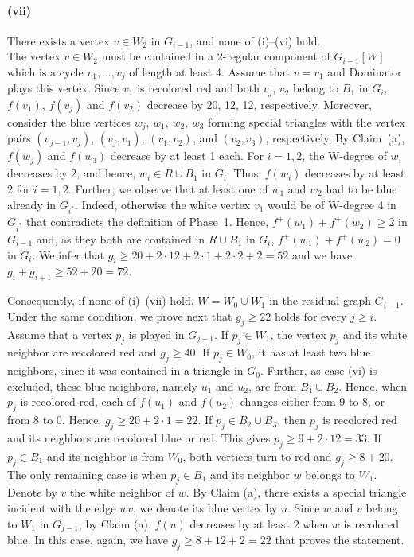 \documentclass[12pt]{article}
\begin{document}
\paragraph{(vii)} There exists a vertex $v \in W_2$ in $G_{i-1}$,  and none of (i)--(vi) hold.\\
The vertex $v\in W_2$ must be contained in a 2-regular component of $G_{i-1}[W]$ which is a cycle $v_1,\dots,v_j$ of length at least 4. Assume that $v=v_1$ and Dominator plays this vertex. Since $v_1$ is recolored red and both $v_j$, $v_2$ belong to $B_1$ in $G_i$, $f(v_1)$, $f(v_j)$
and $f(v_2)$ decrease by 20, 12, 12, respectively. Moreover, consider the blue vertices $w_j$, $w_1$, $w_2$, $w_3$ forming special triangles with the vertex pairs $(v_{j-1},v_j)$, $(v_{j},v_1)$, $(v_{1},v_2)$, and $(v_{2},v_3)$, respectively. By Claim~(a), $f(w_j)$ and $f(w_3)$  decrease by at least 1 each. For $i=1,2$, the W-degree of $w_i$ decreases by 2; and hence, $w_i \in R\cup B_1$ in $G_i$. Thus, $f(w_i)$ decreases by at least 2 for $i=1, 2$. Further, we observe that at least one of $w_1$ and $w_2$ had to be blue already in $G_{i^*}$. Indeed, otherwise the white vertex $v_1$ would be of W-degree 4 in $G_{i^*}$ that contradicts the definition of Phase~1. Hence, $f^+(w_1)+f^+(w_2)\ge 2$ in $G_{i-1}$ and, as they both are contained in $R\cup B_1$ in $G_i$, $f^+(w_1)+f^+(w_2)=0$ in $G_i$. We infer that $g_i \ge 20+2\cdot 12 +2\cdot 1 +2\cdot 2+2=52$ and we have $g_i+g_{i+1}\ge 52+20=72$.

\medskip

Consequently, if none of (i)--(vii) hold, $W=W_0 \cup W_1$ in the residual graph $G_{i-1}$.
Under the same condition, we prove next that $g_j \ge 22$ holds for every $j \ge i$.
Assume that a vertex $p_j$ is played in $G_{j-1}$. If $p_j\in W_1$, the vertex $p_j$ and its white neighbor are recolored red and $g_j \ge 40$. If $p_j \in W_0$, it has at least two blue neighbors, since it was contained in a triangle in $G_0$. Further, as case (vi) is excluded, these blue neighbors, namely $u_1$ and $u_2$, are from $B_1\cup B_2$. Hence, when $p_j$ is recolored red, each of  $f(u_1)$ and $f(u_2)$  changes either from 9 to 8, or from 8 to 0. Hence, $g_j \ge 20+2\cdot 1=22$. If $p_j \in B_2 \cup B_3$, then $p_j$ is recolored red and its neighbors are recolored blue or red. This gives $p_j \ge 9+ 2\cdot 12=33$. If $p_j \in B_1$ and its neighbor is from $W_0$, both vertices turn to red and $g_j \ge 8+20$. The only remaining case is when $p_j\in B_1$ and its neighbor $w$ belongs to $W_1$. Denote by $v$ the white neighbor of $w$. By Claim (a), there exists a special triangle incident with the edge $wv$, we denote its blue vertex  by $u$. Since $w$ and $v$ belong to $W_1$ in $G_{j-1}$, by Claim (a),  $f(u)$ decreases by at least 2 when $w$ is recolored blue. In this case, again, we have $g_j \ge 8+12+2=22$ that proves the statement.
\end{document}
